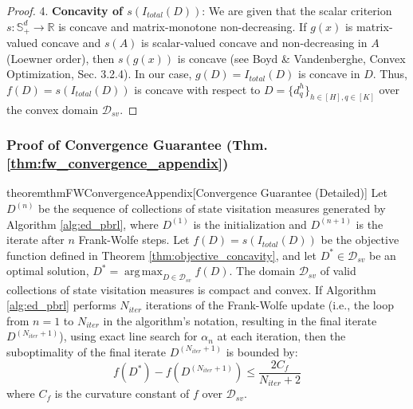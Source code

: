 \documentclass{article}
\DeclareMathOperator*{\argmax}{arg\,max}
\begin{document}
\begin{proof}
4.  \textbf{Concavity of $s(I_{total}(D))$}:
    We are given that the scalar criterion $s: \mathbb{S}^d_+ \to \mathbb{R}$ is concave and matrix-monotone non-decreasing.
    If $g(x)$ is matrix-valued concave and $s(A)$ is scalar-valued concave and non-decreasing in $A$ (Loewner order), then $s(g(x))$ is concave (see Boyd \& Vandenberghe, Convex Optimization, Sec. 3.2.4).
    In our case, $g(D) = I_{total}(D)$ is concave in $D$.
    Thus, $f(D) = s(I_{total}(D))$ is concave with respect to $D = \{d^h_q\}_{h \in [H], q \in [K]}$ over the convex domain $\mathcal{D}_{sv}$.
\end{proof}

\subsubsection{Proof of Convergence Guarantee (Thm. \ref{thm:fw_convergence_appendix})}
\label{proof:fw_convergence_full}

\begin{restatable}{theorem}{thmFWConvergenceAppendix}[Convergence Guarantee (Detailed)]
\label{thm:fw_convergence_appendix}
Let $D^{(n)}$ be the sequence of collections of state visitation measures generated by Algorithm \ref{alg:ed_pbrl}, where $D^{(1)}$ is the initialization and $D^{(n+1)}$ is the iterate after $n$ Frank-Wolfe steps. Let $f(D) = s(I_{total}(D))$ be the objective function defined in Theorem \ref{thm:objective_concavity}, and let $D^* \in \mathcal{D}_{sv}$ be an optimal solution, $D^* = \argmax_{D \in \mathcal{D}_{sv}} f(D)$. The domain $\mathcal{D}_{sv}$ of valid collections of state visitation measures is compact and convex.
If Algorithm \ref{alg:ed_pbrl} performs $N_{iter}$ iterations of the Frank-Wolfe update (i.e., the loop from $n=1$ to $N_{iter}$ in the algorithm's notation, resulting in the final iterate $D^{(N_{iter}+1)}$), using exact line search for $\alpha_n$ at each iteration, then the suboptimality of the final iterate $D^{(N_{iter}+1)}$ is bounded by:
\[ f(D^*) - f(D^{(N_{iter}+1)}) \le \frac{2 C_f}{N_{iter} + 2} \]
where $C_f$ is the curvature constant of $f$ over $\mathcal{D}_{sv}$.
\end{restatable}

\thmFWConvergenceAppendix*
\end{document}
